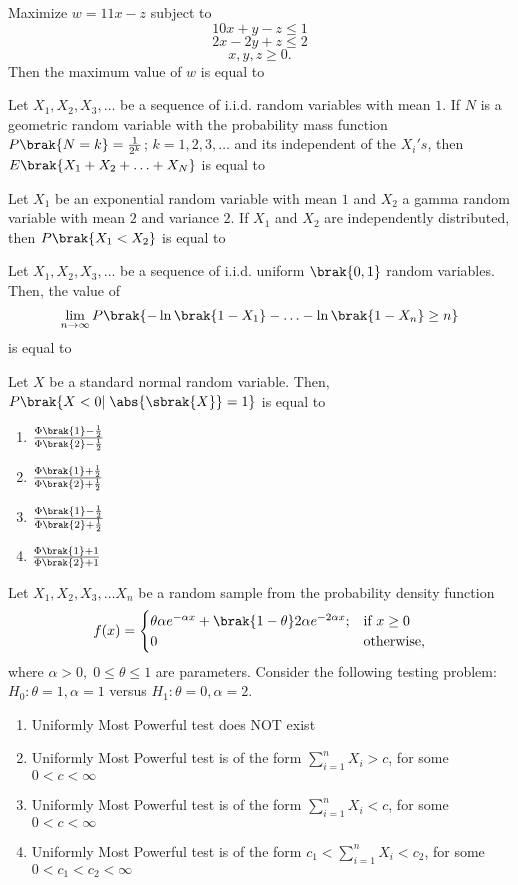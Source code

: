 \item Maximize $w=11x-z$ subject to $$10x+y-z\leq 1$$ $$2x-2y+z\leq 2$$ $$x,y,z\geq 0.$$ Then the maximum value of $w$ is equal to \underline{\hspace{2cm}}
\item Let $X_1,X_2,X_3,\ldots$ be a sequence of i.i.d. random variables with mean $1$. If $N$ is a geometric random variable with the probability mass function $P\brak{N=k}=\frac{1}{2^k}$; $k=1,2,3,\ldots$ and its independent of the $X_i's$, then $E\brak{X_1+X_2+\ldots+X_N}$ is equal to \underline{\hspace{2cm}}
\item Let $X_1$ be an exponential random variable with mean $1$ and $X_2$ a gamma random variable with mean $2$ and variance $2$. If $X_1$ and $X_2$ are independently distributed, then $P\brak{X_1<X_2}$ is equal to \underline{\hspace{2cm}}
\item Let $X_1,X_2,X_3,\ldots$ be a sequence of i.i.d. uniform $\brak{0,1}$ random variables. Then, the value of $$\lim_{n\to \infty}P\brak{-\ln{\brak{1-X_1}}-\ldots-\ln{\brak{1-X_n}}\geq n}$$ is equal to \underline{\hspace{2cm}}
\item Let $X$ be a standard normal random variable. Then, $P\brak{X<0|\;\abs{\sbrak{X}}=1}$ is equal to
\begin{enumerate}
    \item $\frac{\Phi\brak{1}-\frac{1}{2}}{\Phi\brak{2}-\frac{1}{2}}$
    \item $\frac{\Phi\brak{1}+\frac{1}{2}}{\Phi\brak{2}+\frac{1}{2}}$
    \item $\frac{\Phi\brak{1}-\frac{1}{2}}{\Phi\brak{2}+\frac{1}{2}}$
    \item $\frac{\Phi\brak{1}+1}{\Phi\brak{2}+1}$
\end{enumerate}
\item Let $X_1,X_2,X_3,\ldots X_n$ be a random sample from the probability density function $$f(x) = 
\begin{cases} 
    \theta \alpha e^{-\alpha x}+\brak{1-\theta}2\alpha e^{-2\alpha x}; & \text{if } x \geq 0 \\
    0 & \text{otherwise,} 
\end{cases}
$$
where $\alpha >0,\; 0\leq \theta \leq 1$ are parameters. Consider the following testing problem:\\
$H_0:\theta =1,\alpha =1$ versus $H_1:\theta=0,\alpha =2.$
\begin{enumerate}
    \item Uniformly Most Powerful test does NOT exist
    \item Uniformly Most Powerful test is of the form $\sum_{i=1}^n X_i>c$, for some $0<c<\infty$
    \item Uniformly Most Powerful test is of the form $\sum_{i=1}^n X_i<c$, for some $0<c<\infty$
    \item Uniformly Most Powerful test is of the form $c_1<\sum_{i=1}^n X_i<c_2$, for some $0<c_1<c_2<\infty$
\end{enumerate}

